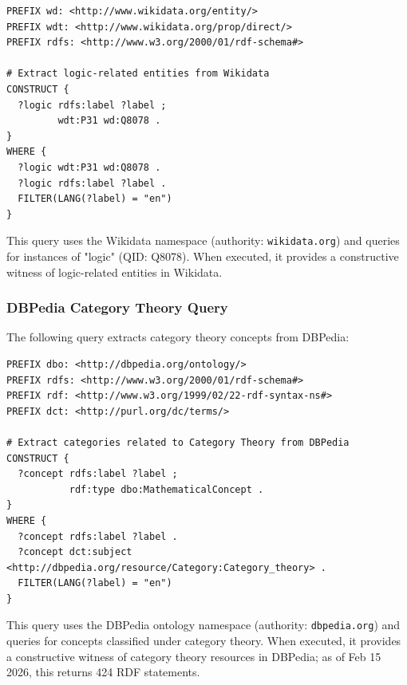 \begin{verbatim}
PREFIX wd: <http://www.wikidata.org/entity/>
PREFIX wdt: <http://www.wikidata.org/prop/direct/>
PREFIX rdfs: <http://www.w3.org/2000/01/rdf-schema#>

# Extract logic-related entities from Wikidata
CONSTRUCT {
  ?logic rdfs:label ?label ;
         wdt:P31 wd:Q8078 .
}
WHERE {
  ?logic wdt:P31 wd:Q8078 .
  ?logic rdfs:label ?label .
  FILTER(LANG(?label) = "en")
}
\end{verbatim}

This query uses the Wikidata namespace (authority: \texttt{wikidata.org}) and queries for instances of "logic" (QID: Q8078). When executed, it provides a constructive witness of logic-related entities in Wikidata.

\subsubsection{DBPedia Category Theory Query}

The following query extracts category theory concepts from DBPedia:

\begin{verbatim}
PREFIX dbo: <http://dbpedia.org/ontology/>
PREFIX rdfs: <http://www.w3.org/2000/01/rdf-schema#>
PREFIX rdf: <http://www.w3.org/1999/02/22-rdf-syntax-ns#>
PREFIX dct: <http://purl.org/dc/terms/>

# Extract categories related to Category Theory from DBPedia
CONSTRUCT {
  ?concept rdfs:label ?label ;
           rdf:type dbo:MathematicalConcept .
}
WHERE {
  ?concept rdfs:label ?label .
  ?concept dct:subject <http://dbpedia.org/resource/Category:Category_theory> .
  FILTER(LANG(?label) = "en")
}
\end{verbatim}

This query uses the DBPedia ontology namespace (authority: \texttt{dbpedia.org}) and queries for concepts classified under category theory. When executed, it provides a constructive witness of category theory resources in DBPedia; as of Feb 15 2026, this returns 424 RDF statements.

